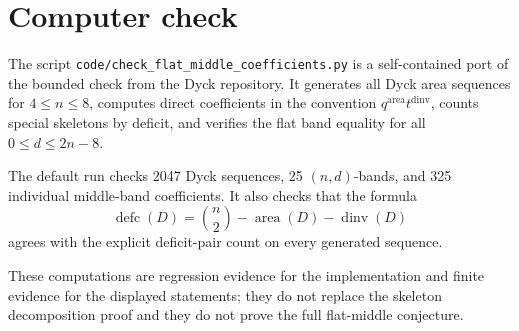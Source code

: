 \documentclass{article}
\begin{document}
\section{Computer check}

The script \texttt{code/check\_flat\_middle\_coefficients.py} is a
self-contained port of the bounded check from the Dyck repository.  It
generates all Dyck area sequences for \(4\le n\le 8\), computes direct
coefficients in the convention \(q^{\operatorname{area}}t^{\operatorname{dinv}}\),
counts special skeletons by deficit, and verifies the flat band equality for
all \(0\le d\le 2n-8\).

The default run checks 2047 Dyck sequences, 25 \((n,d)\)-bands, and 325
individual middle-band coefficients.  It also checks that the formula
\[
  \operatorname{defc}(D)
  =\binom{n}{2}-\operatorname{area}(D)-\operatorname{dinv}(D)
\]
agrees with the explicit deficit-pair count on every generated sequence.

These computations are regression evidence for the implementation and finite
evidence for the displayed statements; they do not replace the skeleton
decomposition proof and they do not prove the full flat-middle conjecture.
\end{document}
